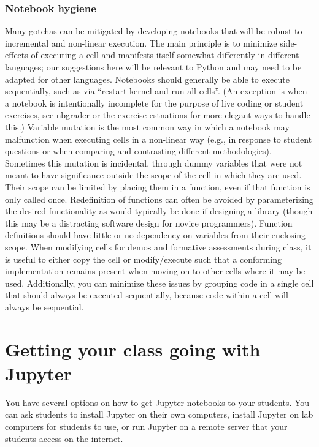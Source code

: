 \documentclass[]{book}
\begin{document}
\subsection{Notebook hygiene}\label{notebook-hygiene}

Many gotchas can be mitigated by developing notebooks that will be
robust to incremental and non-linear execution. The main principle is to
minimize side-effects of executing a cell and manifests itself somewhat
differently in different languages; our suggestions here will be
relevant to Python and may need to be adapted for other languages.
Notebooks should generally be able to execute sequentially, such as via
``restart kernel and run all cells''. (An exception is when a notebook
is intentionally incomplete for the purpose of live coding or student
exercises, see nbgrader or the exercise estnations for more elegant ways
to handle this.) Variable mutation is the most common way in which a
notebook may malfunction when executing cells in a non-linear way (e.g.,
in response to student questions or when comparing and contrasting
different methodologies). Sometimes this mutation is incidental, through
dummy variables that were not meant to have significance outside the
scope of the cell in which they are used. Their scope can be limited by
placing them in a function, even if that function is only called once.
Redefinition of functions can often be avoided by parameterizing the
desired functionality as would typically be done if designing a library
(though this may be a distracting software design for novice
programmers). Function definitions should have little or no dependency
on variables from their enclosing scope. When modifying cells for demos
and formative assessments during class, it is useful to either copy the
cell or modify/execute such that a conforming implementation remains
present when moving on to other cells where it may be used.
Additionally, you can minimize these issues by grouping code in a single
cell that should always be executed sequentially, because code within a
cell will always be sequential.

\chapter{Getting your class going with Jupyter}\label{getting-going}

You have several options on how to get Jupyter notebooks to your
students. You can ask students to install Jupyter on their own
computers, install Jupyter on lab computers for students to use, or run
Jupyter on a remote server that your students access on the internet.
\end{document}
